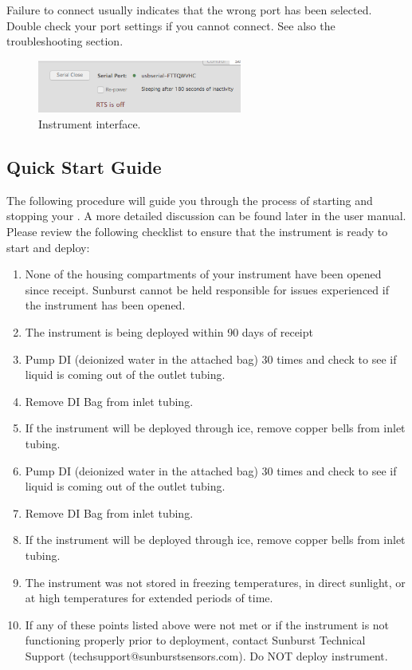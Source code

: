 Failure to connect usually indicates that the wrong port has been selected. Double check your port settings if you cannot connect. See also the troubleshooting section.

\begin{figure}[ht]
\centering
\includegraphics[width=0.6\textwidth]{figs/Inst_Interface.png}
\caption{Instrument interface.}
\label{fig:InstInterface}
\end{figure}


\subsection{Quick Start Guide}

The following procedure will guide you through the process of starting and stopping your \instType{}. A more detailed discussion can be found later in the user manual.  Please review the following checklist to ensure that the instrument is ready to start and deploy:

\begin{enumerate}
\item None of the housing compartments of your instrument have been opened since receipt. Sunburst cannot be held responsible for issues experienced if the instrument has been opened.
\item The instrument is being deployed within 90 days of receipt

\ifcase \inst	%

\item Pump DI (deionized water in the attached bag) 30 times and check to see if liquid is coming out of the outlet tubing.
\item Remove DI Bag from inlet tubing.
\item If the instrument will be deployed through ice, remove copper bells from inlet tubing.

\or			%

\item Pump DI (deionized water in the attached bag) 30 times and check to see if liquid is coming out of the outlet tubing.
\item Remove DI Bag from inlet tubing.
\item If the instrument will be deployed through ice, remove copper bells from inlet tubing.

\or			%

\fi

\item The instrument was not stored in freezing temperatures, in direct sunlight, or at high temperatures for extended periods of time.
\item If any of these points listed above were not met or if the instrument is not functioning properly prior to deployment, contact Sunburst Technical Support (techsupport@sunburstsensors.com).  Do NOT deploy instrument.
\end{enumerate}


